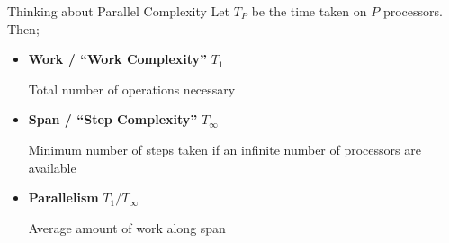 \documentclass[english,compress]{beamer}
\begin{document}
\begin{frame}{Thinking about Parallel Complexity}
  Let $T_P$ be the time taken on $P$ processors. Then;
  \begin{itemize}
    \item \textbf{Work / ``Work Complexity''} $T_1$

      Total number of operations necessary
    \item \textbf{Span / ``Step Complexity''} $T_\infty$

      Minimum number of steps taken if an infinite number of processors are available
    \item \textbf{Parallelism} $T_1/T_\infty$

      Average amount of work along span
  \end{itemize}
  \uncover<+->{}
\end{frame}
\end{document}
